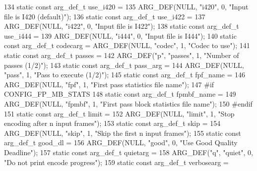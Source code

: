 \begin{DoxyCodeInclude}
{{134 \textcolor{keyword}{static} \textcolor{keyword}{const} arg\_def\_t use\_i420 =
135     ARG\_DEF(NULL, \textcolor{stringliteral}{"i420"}, 0, \textcolor{stringliteral}{"Input file is I420 (default)"});
136 \textcolor{keyword}{static} \textcolor{keyword}{const} arg\_def\_t use\_i422 =
137     ARG\_DEF(NULL, \textcolor{stringliteral}{"i422"}, 0, \textcolor{stringliteral}{"Input file is I422"});
138 \textcolor{keyword}{static} \textcolor{keyword}{const} arg\_def\_t use\_i444 =
139     ARG\_DEF(NULL, \textcolor{stringliteral}{"i444"}, 0, \textcolor{stringliteral}{"Input file is I444"});
140 \textcolor{keyword}{static} \textcolor{keyword}{const} arg\_def\_t codecarg = ARG\_DEF(NULL, \textcolor{stringliteral}{"codec"}, 1, \textcolor{stringliteral}{"Codec to use"});
141 \textcolor{keyword}{static} \textcolor{keyword}{const} arg\_def\_t passes =
142     ARG\_DEF(\textcolor{stringliteral}{"p"}, \textcolor{stringliteral}{"passes"}, 1, \textcolor{stringliteral}{"Number of passes (1/2)"});
143 \textcolor{keyword}{static} \textcolor{keyword}{const} arg\_def\_t pass\_arg =
144     ARG\_DEF(NULL, \textcolor{stringliteral}{"pass"}, 1, \textcolor{stringliteral}{"Pass to execute (1/2)"});
145 \textcolor{keyword}{static} \textcolor{keyword}{const} arg\_def\_t fpf\_name =
146     ARG\_DEF(NULL, \textcolor{stringliteral}{"fpf"}, 1, \textcolor{stringliteral}{"First pass statistics file name"});
147 \textcolor{preprocessor}{#if CONFIG\_FP\_MB\_STATS}
148 \textcolor{keyword}{static} \textcolor{keyword}{const} arg\_def\_t fpmbf\_name =
149     ARG\_DEF(NULL, \textcolor{stringliteral}{"fpmbf"}, 1, \textcolor{stringliteral}{"First pass block statistics file name"});
150 \textcolor{preprocessor}{#endif}
151 \textcolor{keyword}{static} \textcolor{keyword}{const} arg\_def\_t limit =
152     ARG\_DEF(NULL, \textcolor{stringliteral}{"limit"}, 1, \textcolor{stringliteral}{"Stop encoding after n input frames"});
153 \textcolor{keyword}{static} \textcolor{keyword}{const} arg\_def\_t skip =
154     ARG\_DEF(NULL, \textcolor{stringliteral}{"skip"}, 1, \textcolor{stringliteral}{"Skip the first n input frames"});
155 \textcolor{keyword}{static} \textcolor{keyword}{const} arg\_def\_t good\_dl =
156     ARG\_DEF(NULL, \textcolor{stringliteral}{"good"}, 0, \textcolor{stringliteral}{"Use Good Quality Deadline"});
157 \textcolor{keyword}{static} \textcolor{keyword}{const} arg\_def\_t quietarg =
158     ARG\_DEF(\textcolor{stringliteral}{"q"}, \textcolor{stringliteral}{"quiet"}, 0, \textcolor{stringliteral}{"Do not print encode progress"});
159 \textcolor{keyword}{static} \textcolor{keyword}{const} arg\_def\_t verbosearg =
}}
\end{DoxyCodeInclude}
